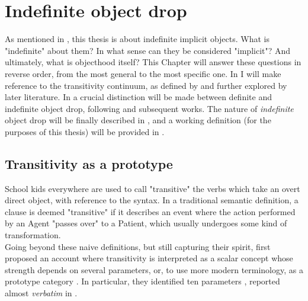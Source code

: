 \setchapterpreamble[u]{\margintoc}
\chapter{Indefinite object drop} %

As mentioned in , this thesis is about indefinite implicit objects. What is "indefinite" about them? In what sense can they be considered "implicit"? And ultimately, what is objecthood itself? This Chapter will answer these questions in reverse order, from the most general to the most specific one. In  I will make reference to the transitivity continuum, as defined by \textcite{HopperThompson1980} and further explored by later literature. In  a crucial distinction will be made between definite and indefinite object drop, following \textcite{Fillmore1986} and subsequent works. The nature of \textit{indefinite} object drop will be finally described in , and a working definition (for the purposes of this thesis) will be provided in .

\section{Transitivity as a prototype} 

School kids everywhere are used to call "transitive" the verbs which take an overt direct object, with reference to the syntax. In a traditional semantic definition, a clause is deemed "transitive" if it describes an event where the action performed by an Agent "passes over" to a Patient, which usually undergoes some kind of transformation.\\
Going beyond these naive definitions, but still capturing their spirit, \textcite{HopperThompson1980} first proposed an account where transitivity is interpreted as a scalar concept whose strength depends on several parameters, or, to use more modern terminology, as a prototype category \parencite{Naess2007}. In particular, they identified ten parameters \parencite[252]{HopperThompson1980}, reported almost \textit{verbatim} in .

